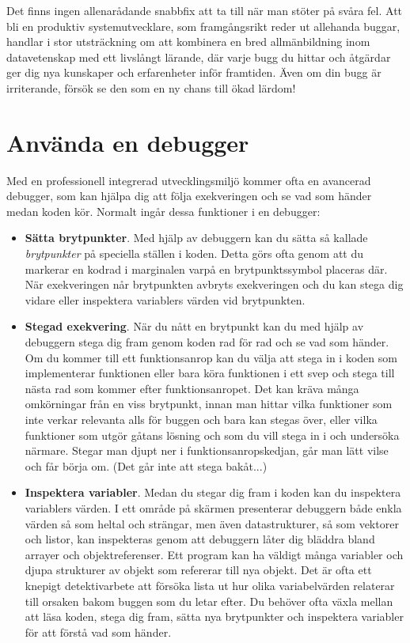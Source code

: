 Det finns ingen allenarådande snabbfix att ta till när man stöter på svåra fel. Att bli en produktiv  systemutvecklare, som framgångsrikt reder ut allehanda buggar, handlar i stor utsträckning om att kombinera en bred allmänbildning inom datavetenskap med ett livslångt lärande, där varje bugg du hittar och åtgärdar ger dig nya kunskaper och erfarenheter inför framtiden.
Även om din bugg är irriterande, försök se den som en ny chans till ökad lärdom!



\section{Använda en debugger}\label{section:debugging}

Med en professionell integrerad utvecklingsmiljö kommer ofta en avancerad debugger, som kan hjälpa dig att följa exekveringen och se vad som händer medan koden kör. Normalt ingår dessa funktioner i en debugger: 

\begin{itemize}
\item \textbf{Sätta brytpunkter}. Med hjälp av debuggern kan du sätta så kallade \textit{brytpunkter} på speciella ställen i koden. Detta görs ofta genom att du markerar en kodrad i marginalen varpå en brytpunktssymbol placeras där. När exekveringen når brytpunkten avbryts exekveringen och du kan stega dig vidare eller inspektera variablers värden vid brytpunkten.  
\item \textbf{Stegad exekvering}. När du nått en brytpunkt kan du med hjälp av debuggern stega dig fram genom koden rad för rad och se vad som händer. Om du kommer till ett funktionsanrop kan du välja att stega in i koden som implementerar funktionen eller bara köra funktionen i ett svep och stega till nästa rad som kommer efter funktionsanropet. Det kan kräva många omkörningar från en viss brytpunkt, innan man hittar vilka funktioner som inte verkar relevanta alls för buggen och bara kan stegas över, eller vilka funktioner som utgör gåtans lösning och som du vill stega in i och undersöka närmare. Stegar man djupt ner i funktionsanropskedjan, går man lätt vilse och får börja om. (Det går inte att stega bakåt...)
 
\item \textbf{Inspektera variabler}. Medan du stegar dig fram i koden kan du inspektera variablers värden. I ett område på skärmen presenterar debuggern både enkla värden så som heltal och strängar, men även datastrukturer, så som vektorer och listor, kan inspekteras genom att debuggern låter dig bläddra bland arrayer och objektreferenser. Ett program kan ha väldigt många variabler och djupa strukturer av objekt som refererar till nya objekt. Det är ofta ett knepigt detektivarbete att försöka lista ut hur olika variabelvärden relaterar till orsaken bakom buggen som du letar efter. Du behöver ofta växla mellan att läsa koden, stega dig fram, sätta nya brytpunkter och inspektera variabler för att förstå vad som händer. 

\end{itemize}

